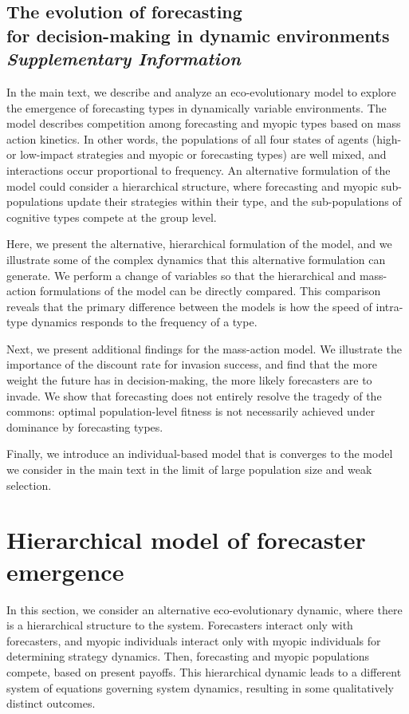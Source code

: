 \documentclass{article}
\begin{document}
\setcounter{figure}{0}
\appendix
\newpage

\begin{center}
\section*{The evolution of forecasting \\
for decision-making in dynamic environments\\ 
\textit{Supplementary Information}}
\end{center}

In the main text, we describe and analyze an eco-evolutionary model to explore the emergence of forecasting types in dynamically variable environments. The model describes competition among forecasting and myopic types based on mass action kinetics. In other words, the populations of all four states of agents (high- or low-impact strategies and myopic or forecasting types) are well mixed, and interactions occur proportional to frequency. An alternative formulation of the model could consider a hierarchical structure, where forecasting and myopic sub-populations update their strategies within their type, and the sub-populations of cognitive types compete at the group level. 

Here, we present the alternative, hierarchical formulation of the model, and we illustrate some of the complex dynamics that this alternative formulation can generate. We perform a change of variables so that the hierarchical and mass-action formulations of the model can be directly compared. This comparison reveals that the primary difference between the models is how the speed of intra-type dynamics responds to the frequency of a type.

Next, we present additional findings for the mass-action model. We illustrate the importance of the discount rate for invasion success, and find that the more weight the future has in decision-making, the more likely forecasters are to invade. We show that forecasting does not entirely resolve the tragedy of the commons: optimal population-level fitness is not necessarily achieved under dominance by forecasting types.

Finally, we introduce an individual-based model that is converges to the model we consider in the main text in the limit of large population size and weak selection. 

\medskip

\section{Hierarchical model of forecaster emergence}\label{altDynam}
In this section, we consider an alternative eco-evolutionary dynamic, where there is a hierarchical structure to the system. Forecasters interact only with forecasters, and myopic individuals interact only with myopic individuals for determining strategy dynamics. Then, forecasting and myopic populations compete, based on present payoffs. This hierarchical dynamic leads to a different system of equations governing system dynamics, resulting in some qualitatively distinct outcomes. 
\end{document}
